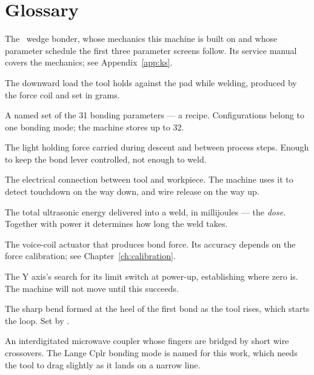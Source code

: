 \chapter{Glossary}
\label{app:glossary}

\begin{description}[leftmargin=!,labelwidth=32mm,style=nextline,font=\normalfont\bfseries]

\item[4523AD] The \basemachine\ wedge bonder, whose mechanics this machine is
  built on and whose parameter schedule the first three parameter screens
  follow. Its service manual covers the mechanics; see Appendix~\ref{app:ks}.

\item[Bond force] The downward load the tool holds against the pad while
  welding, produced by the force coil and set in grams.

\item[Configuration] A named set of the 31 bonding parameters --- a recipe.
  Configurations belong to one bonding mode; the machine stores up to 32.

\item[Constant force] The light holding force carried during descent and
  between process steps. Enough to keep the bond lever controlled, not enough
  to weld.

\item[Contact sensor] The electrical connection between tool and workpiece.
  The machine uses it to detect touchdown on the way down, and wire release on
  the way up.

\item[Energy] The total ultrasonic energy delivered into a weld, in
  millijoules --- the \emph{dose}. Together with power it determines how long
  the weld takes.

\item[Force coil] The voice-coil actuator that produces bond force. Its
  accuracy depends on the force calibration; see Chapter~\ref{ch:calibration}.

\item[Homing] The Y axis's search for its limit switch at power-up,
  establishing where zero is. The machine will not move until this succeeds.

\item[Kink] The sharp bend formed at the heel of the first bond as the tool
  rises, which starts the loop. Set by .

\item[Lange coupler] An interdigitated microwave coupler whose fingers are
  bridged by short wire crossovers. The Lange Cplr bonding mode is named for
  this work, which needs the tool to drag slightly as it lands on a narrow
  line.


\end{description}
